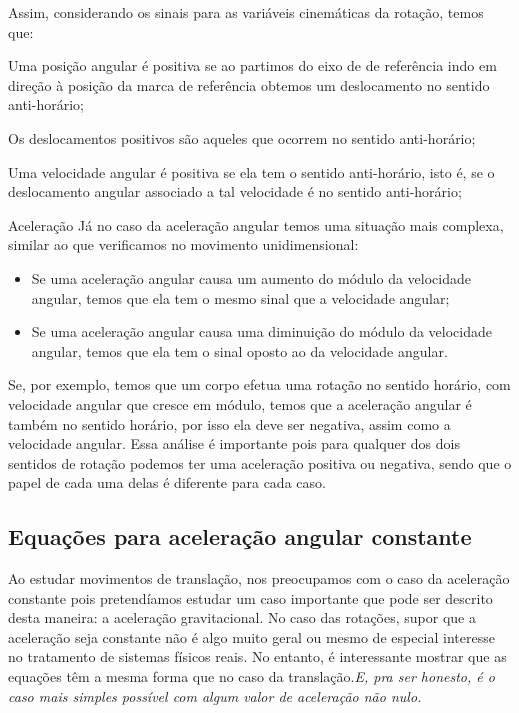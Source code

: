 Assim, considerando os sinais para as variáveis cinemáticas da rotação, temos que:
\begin{description}
    \item[Posição angular] Uma posição angular é positiva se ao partimos do eixo de de referência indo em direção à posição da marca de referência  obtemos um deslocamento no sentido anti-horário;
    \item[Deslocamento angular] Os deslocamentos positivos são aqueles que ocorrem no sentido anti-horário;
    \item[Velocidade angular] Uma velocidade angular é positiva se ela tem o sentido anti-horário, isto é, se o deslocamento angular associado a tal velocidade é no sentido anti-horário;
    \item{Aceleração} Já no caso da aceleração angular temos uma situação mais complexa, similar ao que verificamos no movimento unidimensional:
    \begin{itemize}
        \item Se uma aceleração angular causa um aumento do módulo da velocidade angular, temos que ela tem o mesmo sinal que a velocidade angular;
        \item Se uma aceleração angular causa uma diminuição do módulo da velocidade angular, temos que ela tem o sinal oposto ao da velocidade angular.
    \end{itemize}
%
Se, por exemplo, temos que um corpo efetua uma rotação no sentido horário, com velocidade angular que cresce em módulo, temos que a aceleração angular é também no sentido horário, por isso ela deve ser negativa, assim como a velocidade angular. Essa análise é importante pois para qualquer dos dois sentidos de rotação podemos ter uma aceleração positiva ou negativa, sendo que o papel de cada uma delas é diferente para cada caso.
\end{description}

\subsection{Equações para aceleração angular constante}

Ao estudar movimentos de translação, nos preocupamos com o caso da aceleração constante pois pretendíamos estudar um caso importante que pode ser descrito desta maneira: a aceleração gravitacional. No caso das rotações, supor que a aceleração seja constante não é algo muito geral ou mesmo de especial interesse no tratamento de sistemas físicos reais. No entanto, é interessante mostrar que as equações têm a mesma forma que no caso da translação.\emph{E, pra ser honesto, é o caso mais simples possível com algum valor de aceleração não nulo.}

